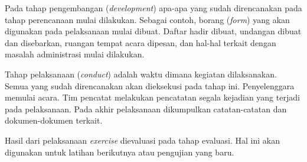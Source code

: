 Pada tahap pengembangan ({\em development}) apa-apa yang sudah direncanakan
pada tahap perencanaan mulai dilakukan. Sebagai contoh, borang ({\em form})
yang akan digunakan pada pelaksanaan mulai dibuat. Daftar hadir dibuat,
undangan dibuat dan disebarkan, ruangan tempat acara dipesan, dan hal-hal 
terkait dengan masalah administrasi mulai dilakukan.

Tahap pelaksanaan ({\em conduct}) adalah waktu dimana kegiatan dilaksanakan.
Semua yang sudah direncanakan akan dieksekusi pada tahap ini.
Penyelenggara memulai acara.
Tim pencatat melakukan pencatatan segala kejadian yang terjadi pada
pelaksanaan.
Pada akhir pelaksanaan dikumpulkan catatan-catatan dan dokumen-dokumen terkait.

Hasil dari pelaksanaan {\em exercise} dievaluasi pada tahap evaluasi.
Hal ini akan digunakan untuk latihan berikutnya atau pengujian yang baru.
